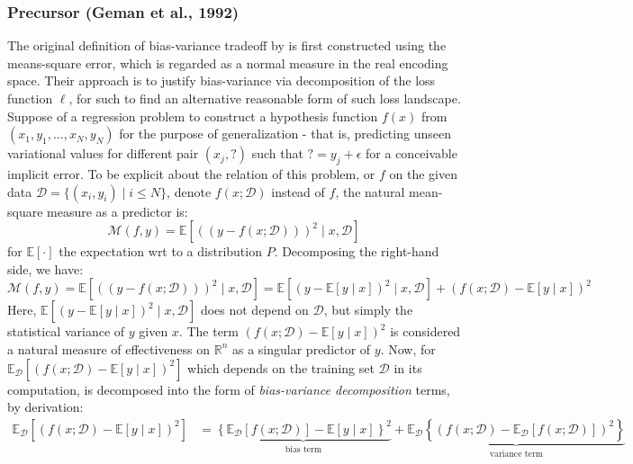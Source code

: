 \documentclass[10pt]{article} %
\begin{document}
\subsubsection{Precursor (Geman et al., 1992)}

The original definition of bias-variance tradeoff by \cite{6797087} is first constructed using the means-square error, which is regarded as a normal measure in the real encoding space. Their approach is to justify bias-variance via decomposition of the loss function $\ell$, for such to find an alternative reasonable form of such loss landscape. Suppose of a regression problem to construct a hypothesis function $f(x)$ from $(x_{1},y_{1},\dots,x_{N},y_{N})$ for the purpose of generalization - that is, predicting unseen variational values for different pair $(x_{j}, \mathord{?})$ such that $\mathord{?}=y_{j}+\epsilon$ for a conceivable implicit error. To be explicit about the relation of this problem, or $f$ on the given data $\mathcal{D}=\{(x_i, y_i)\mid i \leq N\}$, denote $f(x;\mathcal{D})$ instead of $f$, the natural mean-square measure as a predictor is: 
\begin{equation}
    \mathcal{M}(f,y) = \mathbb{E} \left[((y-f(x;\mathcal{D})))^{2}\mid x, \mathcal{D}\right] 
\end{equation} for $\mathbb{E}[\cdot]$ the expectation wrt to a distribution $P$. Decomposing the right-hand side, we have: 
\begin{equation}
    \mathcal{M}(f,y) = \mathbb{E} \left[((y-f(x;\mathcal{D})))^{2}\mid x, \mathcal{D}\right] = \mathbb{E}\left[(y-\mathbb{E}[y\mid x])^{2}\mid x,\mathcal{D}\right] + (f(x;\mathcal{D})-\mathbb{E}[y\mid x])^{2}
\end{equation}
Here, $\mathbb{E}\left[(y-\mathbb{E}[y\mid x])^{2}\mid x,\mathcal{D}\right]$ does not depend on $\mathcal{D}$, but simply the statistical variance of $y$ given $x$. The term $(f(x;\mathcal{D})-\mathbb{E}[y\mid x])^{2}$ is considered a natural measure of effectiveness on $\mathbb{R}^{n}$ as a singular predictor of $y$. Now, for $\mathbb{E}_{\mathcal{D}}\left[(f(x;\mathcal{D})-\mathbb{E}[y\mid x])^{2}\right]$ which depends on the training set $\mathcal{D}$ in its computation, is decomposed into the form of \textit{bias-variance decomposition} terms, by derivation: 
\begin{equation}
    \begin{split}
        \mathbb{E}_{\mathcal{D}} \left[(f(x;\mathcal{D})-\mathbb{E}[y\mid x])^{2}\right] & = \underbrace{\left\{ \mathbb{E}_{\mathcal{D}}[f(x;\mathcal{D})] - \mathbb{E}[y\mid x] \right\}^{2}}_{\text{bias term}} + \underbrace{\mathbb{E}_{\mathcal{D}} \left\{(f(x;\mathcal{D})- \mathbb{E}_{\mathcal{D}}[f(x;\mathcal{D})])^{2}\right\}}_{\text{variance term}}
    \end{split}
\end{equation}
\end{document}
